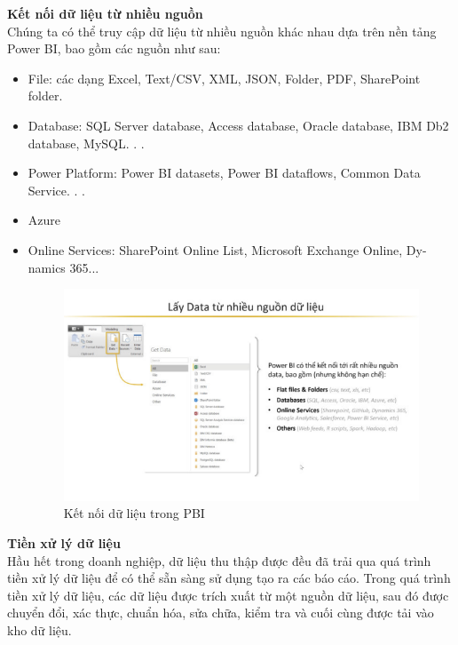 \textbf{Kết nối dữ liệu từ nhiều nguồn}\\
Chúng ta có thể truy cập dữ liệu từ nhiều nguồn khác nhau dựa trên nền
tảng Power BI, bao gồm các nguồn như sau:
\begin{itemize}[label=$-$]
    \item File: các dạng Excel, Text/CSV, XML, JSON, Folder, PDF, SharePoint folder.
    \item Database: SQL Server database, Access database, Oracle database, IBM Db2 database, MySQL. . .
    \item Power Platform: Power BI datasets, Power BI dataflows, Common Data Service. . .
    \item Azure
    \item Online Services: SharePoint Online List, Microsoft Exchange Online, Dy-namics 365...
\begin{center}
            \begin{figure}[!h]
                \centering
                \includegraphics[scale = 1]{figures/Duyen/Kết nối dữ liệu trong PBI.PNG}
              \caption{Kết nối dữ liệu trong PBI}
            \end{figure}
\end{center}
\end{itemize}
\newpage
\textbf{Tiền xử lý dữ liệu}\\
Hầu hết trong doanh nghiệp, dữ liệu thu thập được đều đã trải qua quá trình tiền xử lý dữ liệu để có thể sẵn sàng sử dụng tạo ra các báo cáo. Trong quá trình tiền xử lý dữ liệu, các dữ liệu được trích xuất từ một nguồn dữ liệu, sau đó được chuyển đổi, xác thực, chuẩn hóa, sửa chữa, kiểm tra và cuối cùng được tải vào kho dữ liệu.
